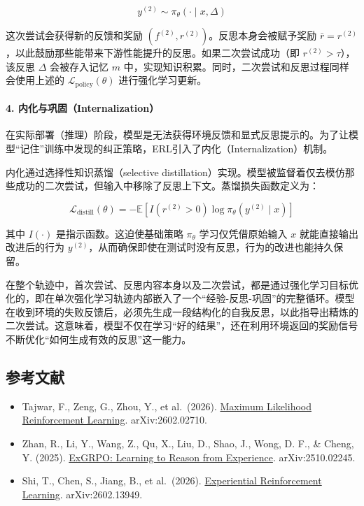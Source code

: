 \[
y^{(2)}\sim\pi_\theta(\cdot\mid x,\Delta)
\]

这次尝试会获得新的反馈和奖励 \((f^{(2)},r^{(2)})\)。反思本身会被赋予奖励 \(\bar{r}=r^{(2)}\)，以此鼓励那些能带来下游性能提升的反思。如果二次尝试成功（即 \(r^{(2)}\gt\tau\)），该反思 \(\Delta\) 会被存入记忆 \(m\) 中，实现知识积累。同时，二次尝试和反思过程同样会使用上述的 \(\mathcal{L}_{\mathrm{policy}}(\theta)\) 进行强化学习更新。

\hypertarget{ux5185ux5316ux4e0eux5de9ux56fainternalization}{%
\paragraph{4. 内化与巩固（Internalization）}\label{ux5185ux5316ux4e0eux5de9ux56fainternalization}}

在实际部署（推理）阶段，模型是无法获得环境反馈和显式反思提示的。为了让模型``记住''训练中发现的纠正策略，ERL引入了内化（Internalization）机制。

内化通过选择性知识蒸馏（selective distillation）实现。模型被监督着仅去模仿那些成功的二次尝试，但输入中移除了反思上下文。蒸馏损失函数定义为：

\[
\mathcal{L}_{\mathrm{distill}}(\theta)=-\mathbb{E}\left[I(r^{(2)}\gt 0)\log\pi_\theta(y^{(2)}\mid x)\right]
\]

其中 \(I(\cdot)\) 是指示函数。这迫使基础策略 \(\pi_\theta\) 学习仅凭借原始输入 \(x\) 就能直接输出改进后的行为 \(y^{(2)}\)，从而确保即使在测试时没有反思，行为的改进也能持久保留。

在整个轨迹中，首次尝试、反思内容本身以及二次尝试，都是通过强化学习目标优化的，即在单次强化学习轨迹内部嵌入了一个``经验-反思-巩固''的完整循环。模型在收到环境的失败反馈后，必须先生成一段结构化的自我反思，以此指导出精炼的二次尝试。这意味着，模型不仅在学习``好的结果''，还在利用环境返回的奖励信号不断优化``如何生成有效的反思''这一能力。

\FloatBarrier
{}
\hypertarget{ux53c2ux8003ux6587ux732e-113}{%
\subsection{参考文献}\label{ux53c2ux8003ux6587ux732e-113}}

\vspace{0.25em}
\begin{itemize}
\tightlist
\item
  Tajwar, F., Zeng, G., Zhou, Y., et al.~(2026). \href{https://arxiv.org/abs/2602.02710}{Maximum Likelihood Reinforcement Learning}. arXiv:2602.02710.
\item
  Zhan, R., Li, Y., Wang, Z., Qu, X., Liu, D., Shao, J., Wong, D. F., \& Cheng, Y. (2025). \href{https://arxiv.org/abs/2510.02245}{ExGRPO: Learning to Reason from Experience}. arXiv:2510.02245.
\item
  Shi, T., Chen, S., Jiang, B., et al.~(2026). \href{https://arxiv.org/abs/2602.13949}{Experiential Reinforcement Learning}. arXiv:2602.13949.
\end{itemize}

\clearpage
